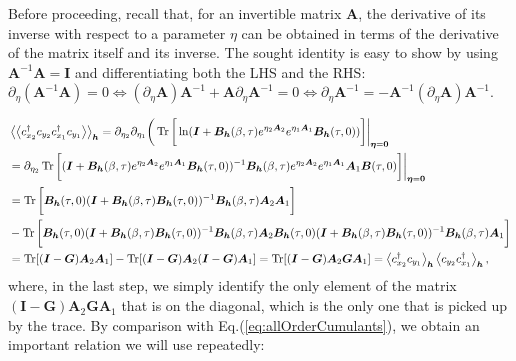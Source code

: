 Before proceeding, recall that, for an invertible matrix $\bm A$, the derivative of its inverse with respect to a parameter $\eta$ can be  obtained in terms of the derivative of the matrix itself and its inverse.
The sought identity is easy to show by using $\bm A^{-1} \bm A = \bm I$ and differentiating both the LHS and the RHS: $\partial_{\eta} ( \bm A^{-1} \bm A ) = 0 \iff ( \partial_\eta \bm A ) \bm A^{-1} + \bm A \partial_\eta \bm A^{-1} = 0 \iff \partial_\eta \bm A^{-1} = - \bm A^{-1} ( \partial_\eta \bm A ) \bm A^{-1}$.

\begin{equation}
\begin{split}
&\left\langle \left\langle c_{x_2}^\dagger c_{y_2} c_{x_1}^\dagger c_{y_1}  \right\rangle\right\rangle_{\bm h} = \partial_{\eta_2} \partial_{\eta_1} \bigg( \operatorname{Tr} \bigg[ \ln ( \bm I + \bm B_{\bm h} ( \beta, \tau ) e^{\eta_2 \bm A_2} e^{\eta_1 \bm A_1} \bm B_{\bm h} ( \tau, 0) ) \bigg] \bigg|_{\bm \eta = \bm 0 } \\
&= \partial_{\eta_2} \operatorname{Tr} \bigg[ ( \bm I + \bm B_{\bm h} ( \beta, \tau ) e^{\eta_2 \bm A_2} e^{\eta_1 \bm A_1} \bm B_{\bm h} ( \tau, 0) )^{-1} \bm B_{\bm h} ( \beta, \tau ) e^{\eta_2 \bm A_2} e^{\eta_1 \bm A_1} \bm A_1 \bm B ( \tau, 0 ) \bigg] \bigg|_{\bm \eta = \bm 0 } \\
&= \operatorname{Tr} \bigg [ \bm B_{\bm h} ( \tau, 0 ) ( \bm I + \bm B_{\bm h} ( \beta, \tau ) \bm B_{\bm h} ( \tau, 0) )^{-1} \bm B_{\bm h} ( \beta, \tau ) \bm A_2 \bm A_1  \bigg] \\
&- \operatorname{Tr} \bigg [ \bm B_{\bm h} ( \tau, 0 ) ( \bm I + \bm B_{\bm h} ( \beta, \tau ) \bm B_{\bm h} ( \tau, 0) )^{-1} \bm B_{\bm h} ( \beta, \tau ) \bm A_2 \bm B_{\bm h} ( \tau, 0 ) ( \bm I + \bm B_{\bm h} ( \beta, \tau ) \bm B_{\bm h} ( \tau, 0) )^{-1} \bm B_{\bm h} ( \beta, \tau ) \bm A_1  \bigg] \\
&= \operatorname{Tr} [ ( \bm I - \bm G ) \bm A_2 \bm A_1 ] - \operatorname{Tr} [ ( \bm I - \bm G ) \bm A_2 ( \bm I - \bm G ) \bm A_1 ] = \operatorname{Tr} [ ( \bm I - \bm G ) \bm A_2 \bm G \bm A_1 ] = \left\langle c_{x_2}^\dagger c_{y_1} \right\rangle_{\bm h} \left\langle c_{y_2} c_{x_1}^\dagger \right\rangle_{\bm h} ,
\end{split}
\end{equation}
where, in the last step, we simply identify the only element of the matrix  $( \bm I - \bm G ) \bm A_2 \bm G \bm A_1$ that is on the diagonal, which is the only one that is picked up by the trace.
By comparison with Eq.(\ref{eq:allOrderCumulants}), we obtain an important relation we will use repeatedly:

